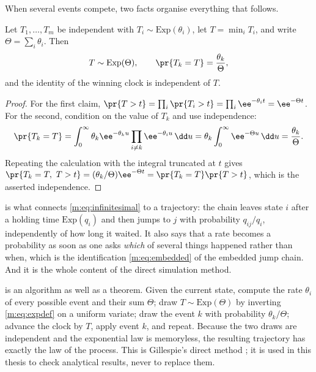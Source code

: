 When several events compete, two facts organise everything that follows.

\begin{proposition}
\label{m:prop:race}
Let $T_1,\dots,T_m$ be independent with $T_i\sim\mathrm{Exp}(\theta_i)$, let
$T=\min_iT_i$, and write $\Theta=\sum_i\theta_i$. Then
\begin{equation}
\label{m:eq:race}
T\sim\mathrm{Exp}(\Theta),
\qquad
\pr{T_k=T} = \frac{\theta_k}{\Theta},
\end{equation}
and the identity of the winning clock is independent of $T$.
\end{proposition}

\begin{proof}
For the first claim,
$\pr{T>t} = \prod_i\pr{T_i>t} = \prod_i\ee^{-\theta_it} = \ee^{-\Theta t}$.
For the second, condition on the value of $T_k$ and use independence:
\begin{equation*}
\pr{T_k=T}
= \int_0^\infty\theta_k\ee^{-\theta_ku}\prod_{i\neq k}\ee^{-\theta_iu}\,\dd u
= \theta_k\int_0^\infty\ee^{-\Theta u}\,\dd u
= \frac{\theta_k}{\Theta} .
\end{equation*}
Repeating the calculation with the integral truncated at $t$ gives
$\pr{T_k=T,\ T>t} = (\theta_k/\Theta)\ee^{-\Theta t} = \pr{T_k=T}\pr{T>t}$, which is
the asserted independence.
\end{proof}

 is what connects \cref{m:eq:infinitesimal} to a trajectory: the
chain leaves state $i$ after a holding time $\mathrm{Exp}(q_i)$ and then jumps to
$j$ with probability $q_{ij}/q_i$, independently of how long it waited. It also
says that a rate becomes a probability as soon as one asks \emph{which} of several
things happened rather than when, which is the identification \cref{m:eq:embedded}
of the embedded jump chain. And it is the whole content of the direct simulation
method.

\begin{remark}
\label{m:rem:gillespie}
 is an algorithm as well as a theorem. Given the current state,
compute the rate $\theta_i$ of every possible event and their sum $\Theta$; draw
$T\sim\mathrm{Exp}(\Theta)$ by inverting \cref{m:eq:expdef} on a uniform variate;
draw the event $k$ with probability $\theta_k/\Theta$; advance the clock by $T$,
apply event $k$, and repeat. Because the two draws are independent and the
exponential law is memoryless, the resulting trajectory has exactly the law of the
process. This is Gillespie's direct method \cite{Gillespie1977}; it is used in this
thesis to check analytical results, never to replace them.
\end{remark}

